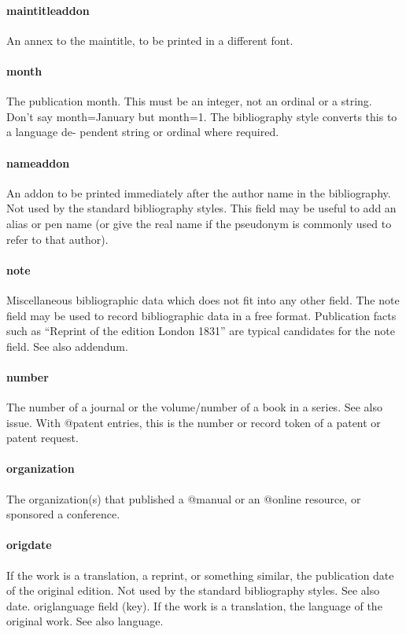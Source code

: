 \documentclass[a4paper,12pt]{report}
\begin{document}
\paragraph{maintitleaddon}
An annex to the maintitle, to be printed in a different font.

\paragraph{month}
The publication month. This must be an integer, not an ordinal or a string. Don’t say
month={January} but month={1}. The bibliography style converts this to a language de-
pendent string or ordinal where required.

\paragraph{nameaddon}
An addon to be printed immediately after the author name in the bibliography. Not used
by the standard bibliography styles. This field may be useful to add an alias or pen name
(or give the real name if the pseudonym is commonly used to refer to that author).

\paragraph{note}
Miscellaneous bibliographic data which does not fit into any other field. The note field
may be used to record bibliographic data in a free format. Publication facts such as “Reprint
of the edition London 1831” are typical candidates for the note field. See also addendum.

\paragraph{number}
The number of a journal or the volume/number of a book in a series. See also issue. 
With @patent entries, this is the number or record token of a patent or patent request.

\paragraph{organization}
The organization(s) that published a @manual or an @online resource, or sponsored a
conference.

\paragraph{origdate}
If the work is a translation, a reprint, or something similar, the publication date of the
original edition. Not used by the standard bibliography styles. See also date.
origlanguage field (key). If the work is a translation, the language of the original work. 
See also language.
\end{document}
